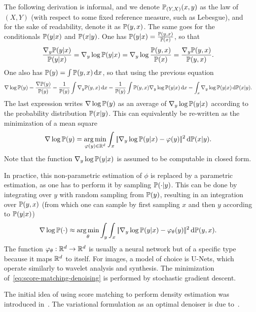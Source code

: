 The following derivation is informal, and we denote $\mathbb{P}_{(Y,X)}(x,y)$ as the law of $(X,Y)$ (with respect to some fixed reference measure, such as Lebesgue), and for the sake of readability, denote it as $\mathbb{P}(y,x)$. The same goes for the conditionals $\mathbb{P}(y|x)$ and $\mathbb{P}(x|y)$. 
%
One has $\mathbb{P}(y|x) = \frac{\mathbb{P}(y,x)}{\mathbb{P}(x)}$, so that 
\begin{equation*}
	\frac{\nabla_y \mathbb{P}(y|x)}{\mathbb{P}(y|x)} = \nabla_y \log \mathbb{P}(y|x) = \nabla_y \log \frac{\mathbb{P}(y,x)}{\mathbb{P}(x)} = \frac{\nabla_y \mathbb{P}(y,x)}{\mathbb{P}(y,x)}.
\end{equation*}
One also has $\mathbb{P}(y) = \int \mathbb{P}(y,x) \, \mathrm{d} x$, so that using the previous equation
\begin{equation*}
	\nabla \log \mathbb{P}(y) = 
	\frac{ \nabla \mathbb{P}(y) }{\mathbb{P}(y)}  = \frac{1}{\mathbb{P}(y)} \int \nabla_y \mathbb{P}(y,x) \, \mathrm{d} x = \frac{1}{\mathbb{P}(y)} \int \mathbb{P}(y,x) \nabla_y \log \mathbb{P}(y|x)  \, \mathrm{d} x
	= \int_x \nabla_y \log \mathbb{P}(y|x)  \, \mathrm{d} \mathbb{P}(x|y).
\end{equation*}
The last expression writes $\nabla \log \mathbb{P}(y)$ as an average of $\nabla_y \log \mathbb{P}(y|x)$ according to the probability distribution $\mathbb{P}(x|y)$. 
%
This can equivalently be re-written as the minimization of a mean square
\begin{equation*}
	\nabla \log \mathbb{P}(y) = \underset{\varphi(y) \in \mathbb{R}^d}{\arg\min} \int_x |\!| \nabla_y \log \mathbb{P}(y|x)  - \varphi(y) |\!|^2 \, \mathrm{d} \mathbb{P}(x|y).
\end{equation*}
Note that the function $\nabla_y \log \mathbb{P}(y|x)$ is assumed to be computable in closed form. 

In practice, this non-parametric estimation of $\phi$ is replaced by a parametric estimation, as one has to perform it by sampling $\mathbb{P}(\cdot|y)$. This can be done by integrating over $y$ with random sampling from $\mathbb{P}(y)$, resulting in an integration over $\mathbb{P}(y,x)$ (from which one can sample by first sampling $x$ and then $y$ according to $\mathbb{P}(y|x)$)
\begin{equation}\label{eq:score-matching-denoising}
	\nabla \log \mathbb{P}(\cdot) \approx \underset{\theta}{\arg\min} \int_y \int_x |\!| \nabla_y \log \mathbb{P}(y|x)  - \varphi_\theta(y) |\!|^2 \, \mathrm{d} \mathbb{P}(y,x).
\end{equation}
The function $\varphi_\theta : \mathbb{R}^d \rightarrow \mathbb{R}^d$ is usually a neural network but of a specific type because it maps $\mathbb{R}^d$ to itself. For images, a model of choice is U-Nets, which operate similarly to wavelet analysis and synthesis. The minimization of~\eqref{eq:score-matching-denoising} is performed by stochastic gradient descent.
 
The initial idea of using score matching to perform density estimation was introduced in~\cite{hyvarinen2005estimation}. The variational formulation as an optimal denoiser is due to~\cite{vincent2011connection}. 


